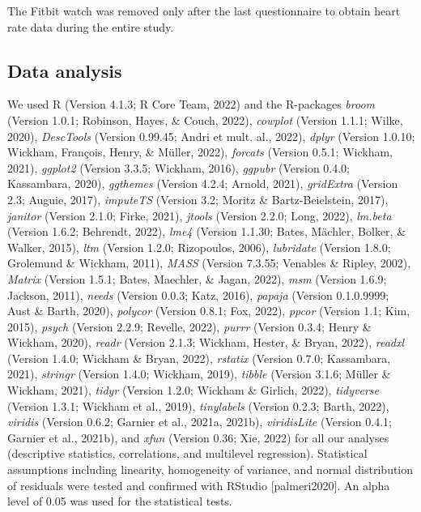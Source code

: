 \documentclass[
  man,floatsintext]{apa6}
\begin{document}
The Fitbit watch was removed only after the last questionnaire to obtain heart rate data during the entire study.

\hypertarget{data-analysis}{%
\subsection{Data analysis}\label{data-analysis}}

We used R (Version 4.1.3; R Core Team, 2022) and the R-packages \emph{broom} (Version 1.0.1; Robinson, Hayes, \& Couch, 2022), \emph{cowplot} (Version 1.1.1; Wilke, 2020), \emph{DescTools} (Version 0.99.45; Andri et mult. al., 2022), \emph{dplyr} (Version 1.0.10; Wickham, François, Henry, \& Müller, 2022), \emph{forcats} (Version 0.5.1; Wickham, 2021), \emph{ggplot2} (Version 3.3.5; Wickham, 2016), \emph{ggpubr} (Version 0.4.0; Kassambara, 2020), \emph{ggthemes} (Version 4.2.4; Arnold, 2021), \emph{gridExtra} (Version 2.3; Auguie, 2017), \emph{imputeTS} (Version 3.2; Moritz \& Bartz-Beielstein, 2017), \emph{janitor} (Version 2.1.0; Firke, 2021), \emph{jtools} (Version 2.2.0; Long, 2022), \emph{lm.beta} (Version 1.6.2; Behrendt, 2022), \emph{lme4} (Version 1.1.30; Bates, Mächler, Bolker, \& Walker, 2015), \emph{ltm} (Version 1.2.0; Rizopoulos, 2006), \emph{lubridate} (Version 1.8.0; Grolemund \& Wickham, 2011), \emph{MASS} (Version 7.3.55; Venables \& Ripley, 2002), \emph{Matrix} (Version 1.5.1; Bates, Maechler, \& Jagan, 2022), \emph{msm} (Version 1.6.9; Jackson, 2011), \emph{needs} (Version 0.0.3; Katz, 2016), \emph{papaja} (Version 0.1.0.9999; Aust \& Barth, 2020), \emph{polycor} (Version 0.8.1; Fox, 2022), \emph{ppcor} (Version 1.1; Kim, 2015), \emph{psych} (Version 2.2.9; Revelle, 2022), \emph{purrr} (Version 0.3.4; Henry \& Wickham, 2020), \emph{readr} (Version 2.1.3; Wickham, Hester, \& Bryan, 2022), \emph{readxl} (Version 1.4.0; Wickham \& Bryan, 2022), \emph{rstatix} (Version 0.7.0; Kassambara, 2021), \emph{stringr} (Version 1.4.0; Wickham, 2019), \emph{tibble} (Version 3.1.6; Müller \& Wickham, 2021), \emph{tidyr} (Version 1.2.0; Wickham \& Girlich, 2022), \emph{tidyverse} (Version 1.3.1; Wickham et al., 2019), \emph{tinylabels} (Version 0.2.3; Barth, 2022), \emph{viridis} (Version 0.6.2; Garnier et al., 2021a, 2021b), \emph{viridisLite} (Version 0.4.1; Garnier et al., 2021b), and \emph{xfun} (Version 0.36; Xie, 2022) for all our analyses (descriptive statistics, correlations, and multilevel regression). Statistical assumptions including linearity, homogeneity of variance, and normal distribution of residuals were tested and confirmed with RStudio {[}palmeri2020{]}. An alpha level of 0.05 was used for the statistical tests.
\end{document}

